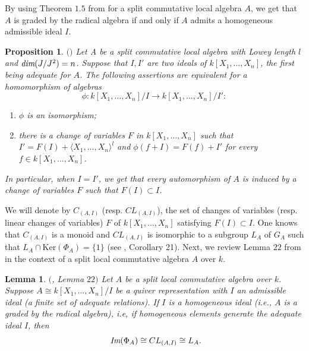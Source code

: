 \documentclass[12pt]{amsart}
\newtheorem{lemma}[theorem]{Lemma}
\newtheorem{proposition}[theorem]{Proposition}
\theoremstyle{definition}
\numberwithin{equation}{section}
\begin{document}
\vskip2mm
\noindent
By using Theorem $1.5$ from \cite{Saorin} for a split commutative local algebra $A$, we get that $A$ is graded by the radical algebra if and only if $A$ admits a homogeneous admissible ideal $I$.


\vskip4mm

\begin{proposition}\label{Proposition 5.2}$($\cite{AS1}$)$  
Let A be a split commutative local algebra with Lowey length $l$ and $\emph{dim}(J/J^2) = n$. Suppose that $I, I'$ are two ideals of $k[X_1,\dots,X_n]$, the first being adequate for $A$. The following assertions are equivalent for a homomorphism of algebras
\begin{equation*}\label{eq19}
\phi: k[X_1,\dots,X_n]/I \longrightarrow k[X_1,\dots,X_n]/I':
\end{equation*}
\begin{enumerate}
\item $\phi$ is an isomorphism;
\vskip2mm
\item there is a change of variables $F$ in $k[X_1,\dots,X_n]$ such that $I'= F(I) + \langle X_1,\dots,X_n\rangle^l$ and $\phi(f+ I) = F(f) + I'$ for every $f\in k[X_1,\dots,X_n]$.  
\end{enumerate}
\vskip2mm
In particular, when $I = I'$, we get that every automorphism of $A$ is induced by a change of variables $F$ such that $F(I)\subset I$.
\end{proposition}
\vskip2mm
\noindent
We will denote by $C_{(A, I)}$ (resp. $CL_{(A, I)}$), the set of changes of variables (resp. linear changes of variables) $F$ of $k[X_1,\dots,X_n]$ satisfying $F(I)\subset I$. One knows that $C_{(A,I)}$ is a monoid and $CL_{(A,I)}$ is isomorphic to a subgroup $L_A$ of $G_A$ such that $L_A\cap \text{Ker}(\Phi_A)=\{1\}$ 
 (see \cite{AS3}, Corollary 21).
\vskip2mm
\noindent
Next, we review Lemma $22$ from \cite{AS3} in the context of a split local commutative algebra $A$ over $k$.

\vskip2mm

\begin{lemma}\label{Lemma 5.3}
$($\cite{AS3}, \emph{Lemma} $22)$ Let $A$ be a split local commutative algebra over $k$. Suppose $A\cong k[X_1,\dots,X_n]/I$ be a quiver representation with $I$ an \emph{admissible ideal} (a finite set of adequate relations). If $I$ is a homogeneous ideal (i.e., $A$ is a graded by the radical algebra), i.e, if homogeneous elements generate the \emph{adequate ideal} $I$, then
\begin{equation*}\label{eq20}
\emph{\text{ Im}}(\Phi_A )\cong CL_{(A, I)}\cong L_A.
\end{equation*}
\end{lemma}
\end{document}
